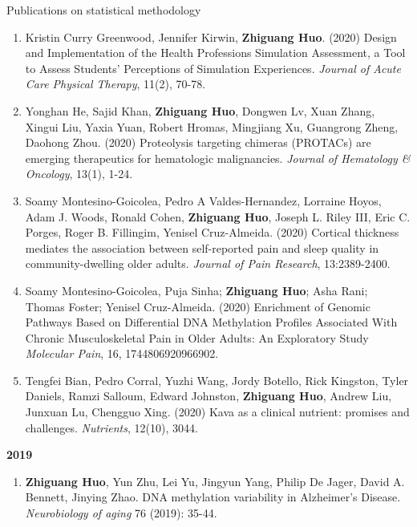 \documentclass{resume} %
\begin{document}
\begin{rSection}{Publications on statistical methodology}
\begin{enumerate}[noitemsep,topsep=0pt, resume]
\item
Kristin Curry Greenwood,  Jennifer Kirwin, {\bf Zhiguang Huo}. (2020)
Design and Implementation of the Health Professions Simulation Assessment, a Tool to Assess Students' Perceptions of Simulation Experiences. 
\emph{Journal of Acute Care Physical Therapy}, 11(2), 70-78.


 
\item
Yonghan He, Sajid Khan, {\bf Zhiguang Huo}, Dongwen Lv, Xuan Zhang, Xingui Liu, Yaxia Yuan, Robert Hromas, Mingjiang Xu, Guangrong Zheng, Daohong Zhou. (2020)
Proteolysis targeting chimeras (PROTACs) are emerging therapeutics for hematologic malignancies.
\emph{Journal of Hematology \& Oncology}, 13(1), 1-24.
\label{bioinfo_13}

\item  
Soamy Montesino-Goicolea, Pedro A Valdes-Hernandez,  Lorraine Hoyos, Adam J. Woods, Ronald Cohen,  {\bf Zhiguang Huo}, Joseph L. Riley III, Eric C. Porges, Roger B. Fillingim, Yenisel Cruz-Almeida. (2020)
Cortical thickness mediates the association between self-reported pain and sleep quality in community-dwelling older adults. 
\emph{Journal of Pain Research}, 13:2389-2400.


\item
Soamy Montesino-Goicolea, Puja Sinha; {\bf Zhiguang Huo}; Asha Rani; Thomas Foster; Yenisel Cruz-Almeida. (2020)
Enrichment of Genomic Pathways Based on Differential DNA Methylation Profiles Associated With Chronic Musculoskeletal Pain in Older Adults: An Exploratory Study
\emph{Molecular Pain}, 16, 1744806920966902.
    \label{bioinfo_12} 

\item  
Tengfei Bian, Pedro Corral, Yuzhi Wang, Jordy Botello, Rick Kingston, Tyler Daniels, Ramzi Salloum, Edward Johnston, {\bf Zhiguang Huo}, Andrew Liu,  Junxuan Lu, Chengguo Xing. (2020)
Kava as a clinical nutrient: promises and challenges.
\emph{Nutrients}, 12(10), 3044.




\end{enumerate}


\textbf{2019}
\begin{enumerate}[noitemsep,topsep=0pt,resume]

\item 
{\bf Zhiguang Huo}, Yun Zhu, Lei Yu, Jingyun Yang, Philip De Jager, David A. Bennett, Jinying Zhao.
 DNA methylation variability in Alzheimer's Disease. \emph{Neurobiology of aging} 76 (2019): 35-44.
    \label{bioinfo_11} 


\end{enumerate}
\end{rSection}
\end{document}
